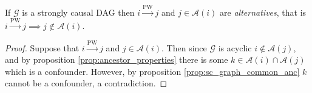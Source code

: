 \documentclass[12pt]{article}
\def\pwgc{\overset{\text{PW}}{\rightarrow}}  %
\def\gcg{\mathcal{G}}  %
\newcommand{\anc}[1]{\mathcal{A}(#1)}  %
\newcommand{\gcgpath}[2]{#1 \rightarrow \cdots \rightarrow #2}  %
\begin{document}
\begin{proposition}
  If $\gcg$ is a strongly causal DAG then $i \pwgc j$ and $j \in \anc{i}$ are
  \textit{alternatives}, that is $i \pwgc j \implies j \notin \anc{i}$.
\end{proposition}
\begin{proof}
  Suppose that $i \pwgc j$ and $j \in \anc{i}$.  Then since $\gcg$ is
  acyclic $i \not\in \anc{j}$, and by proposition
  \ref{prop:ancestor_properties} there is some
  $k \in \anc{i}\cap\anc{j}$ which is a confounder.  However, by
  proposition \ref{prop:sc_graph_common_anc} $k$ cannot be a
  confounder, a contradiction.
\end{proof}



  
\end{document}
